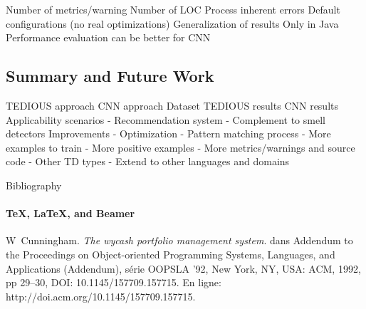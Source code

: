 \documentclass{beamer}
\begin{document}
		Number of metrics/warning
		Number of LOC
		Process inherent errors
		Default configurations (no real optimizations)
		Generalization of results
		Only in Java
		Performance evaluation can be better for CNN
		
		\subsection{Summary and Future Work}	
	
		TEDIOUS approach
		CNN approach
		Dataset
		TEDIOUS results
		CNN results
		Applicability scenarios
			- Recommendation system
			- Complement to smell detectors
		Improvements
			- Optimization
			- Pattern matching process
			- More examples to train
			- More positive examples
			- More metrics/warnings and source code
			- Other TD types
			- Extend to other languages and domains
			
		\begin{frame}[label=bibliography]{Bibliography}
		\framesubtitle{\TeX, \LaTeX, and Beamer}
		\begin{thebibliography}{9}
			W~Cunningham.
			\emph{The wycash portfolio management system}.
			dans Addendum to the Proceedings on Object-oriented Programming Systems, Languages, and Applications (Addendum), s\'{e}rie OOPSLA ’92, New York, NY, USA: ACM, 1992, pp 29–30, DOI: 10.1145/157709.157715. En ligne: http://doi.acm.org/10.1145/157709.157715.
			\end{thebibliography}
		\end{frame}
	
\end{document}
